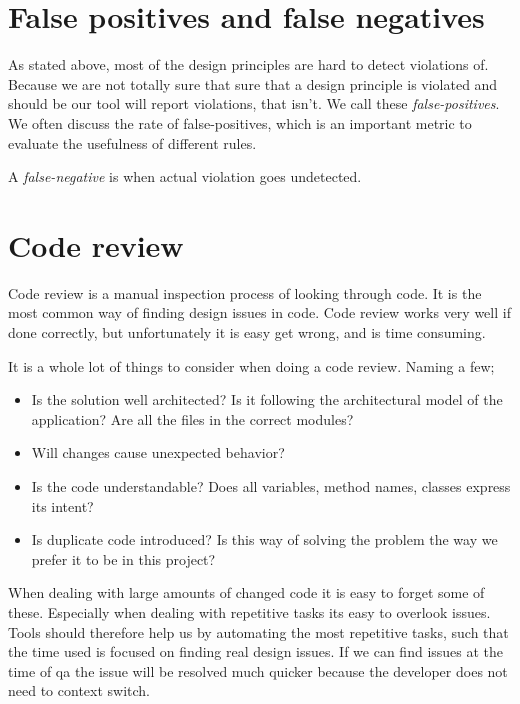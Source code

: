 \documentclass{report}
\begin{document}
\section{False positives and false negatives}
As stated above, most of the design principles are hard to detect violations of. Because we are not totally sure that sure that a design principle is violated and should be our tool will report violations, that isn't. We call these \textit{false-positives}. We often discuss the rate of false-positives, which is an important metric to evaluate the usefulness of different rules.

A \textit{false-negative} is when actual violation goes undetected. 


\section{Code review}
\label{code-review}
Code review is a manual inspection process of looking through code. It is the most common way of finding design issues in code. Code review works very well if done correctly, but unfortunately it is easy get wrong, and is time consuming. 

It is a whole lot of things to consider when doing a code review. Naming a few;

\begin{itemize}
    \item Is the solution well architected? Is it following the architectural model of the application? Are all the files in the correct modules?
    \item Will changes cause unexpected behavior? 
    \item Is the code understandable? Does all variables, method names, classes express its intent?
    \item Is duplicate code introduced? Is this way of solving the problem the way we prefer it to be in this project?
\end{itemize}

When dealing with large amounts of changed code it is easy to forget some of these. Especially when dealing with repetitive tasks its easy to overlook issues. Tools should therefore help us by automating the most repetitive tasks, such that the time used is focused on finding real design issues. If we can find issues at the time of \gls{qa} the issue will be resolved much quicker because the developer does not need to context switch.
\end{document}
